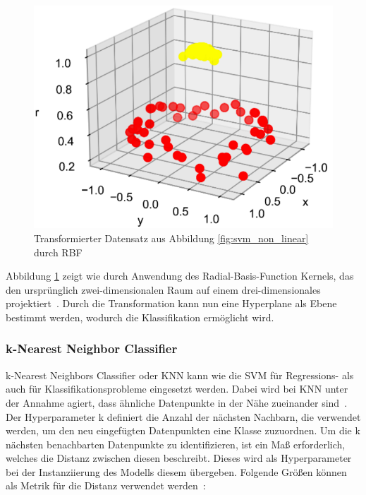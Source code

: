 \begin{figure}[h]
    \centering
    \includegraphics[scale=0.5]{figures/svm_kernel_transformation.png}
    \caption{Transformierter Datensatz aus Abbildung \ref{fig:svm_non_linear} durch RBF}
    \label{fig:svm_transformed}
\end{figure}

Abbildung \ref{fig:svm_transformed} zeigt wie durch Anwendung des Radial-Basis-Function Kernels, das den ursprünglich zwei-dimensionalen Raum auf einem drei-dimensionales projektiert~\cite[S. 442]{10.5555/3133359}.
Durch die Transformation kann nun eine Hyperplane als Ebene bestimmt werden, wodurch die Klassifikation ermöglicht wird.

\pagebreak

\subsubsection*{k-Nearest Neighbor Classifier}

k-Nearest Neighbors Classifier oder KNN kann wie die SVM für Regressions- als auch für Klassifikationsprobleme eingesetzt werden. Dabei wird bei KNN unter der Annahme agiert, dass ähnliche Datenpunkte in der Nähe zueinander sind~\cite[S. 216]{10.5555/2904392}.
Der Hyperparameter k definiert die Anzahl der nächsten Nachbarn, die verwendet werden, um den neu eingefügten Datenpunkten eine Klasse zuzuordnen. Um die k nächsten benachbarten Datenpunkte zu identifizieren, ist ein Maß erforderlich, welches die Distanz zwischen diesen beschreibt. Dieses wird als Hyperparameter bei der Instanziierung des Modells diesem übergeben.
Folgende Größen können als Metrik für die Distanz verwendet werden~\cite[S. 6]{doi:10.1089/big.2018.0175}:

